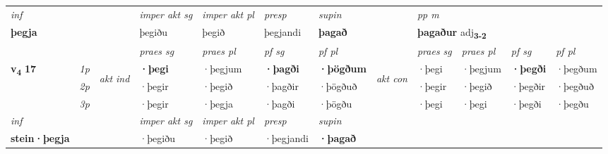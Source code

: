\begin{longtable}[l]{X>{\footnotesize\itshape}llXXXXlXXXX}
   {\textit{inf}} & &  & \textit{imper akt sg} & \textit{imper akt pl}   & \textit{presp} & \textit{supin}  && \textit{pp m} \\*
  {\textbf{þegja}} & && þegiðu  & þegið   & þegjandi &  \textbf{þagað}  && \multicolumn{2}{l}{\textbf{þagaður} adj\textbf{\textsubscript{3-2}}} \\*

\midrule

 & &   & \textit{praes sg}  & \textit{praes pl}    & \textit{ pf sg} & \textit{pf pl} & & \textit{praes sg}  & \textit{praes pl}    & \textit{pf sg} & \textit{pf pl }  \\ \cmidrule{4-7} \cmidrule{9-12}
 \multirow{2}{*}{{{\textbf{v{\textsubscript{4}}} \Large{\textbf{17}}}}}  & 1p & \multirow{3}{*}{\begin{turn}{90}\textit{akt ind}\end{turn}} & \textbf{·þegi} & ·þegjum & \textbf{·þagði} & \textbf{·þögðum} & \multirow{3}{*}{\begin{turn}{90}\textit{akt con}\end{turn}} &·þegi & ·þegjum & \textbf{·þegði} & ·þegðum\\*
 & 2p &  &  ·þegir  & ·þegið & ·þagðir & ·þögðuð & & ·þegir & ·þegið & ·þegðir & ·þegðuð \\*
 & 3p &  & ·þegir & ·þegja & ·þagði & ·þögðu & & ·þegi & ·þegi& ·þegði & ·þegðu \\*
\cmidrule{4-7} \cmidrule{9-12}

   {\textit{inf}} & &  & \textit{imper akt sg} & \textit{imper akt pl}   & \textit{presp} & \textit{supin}   \\*
  {\textbf{stein\allowbreak ·þegja}} & && ·þegiðu  & ·þegið   & ·þegjandi &  \textbf{·þagað}   \\*

\midrule


\end{longtable}
